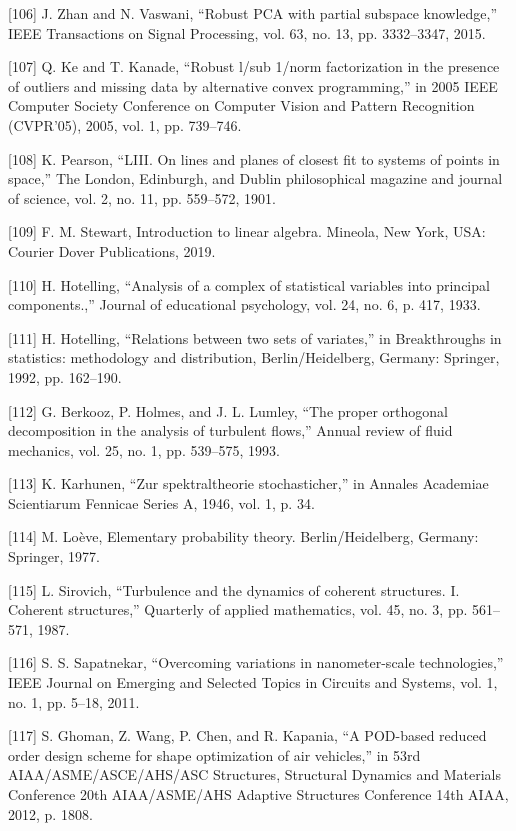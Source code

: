 \documentclass[sn-mathphys-num]{sn-jnl}%
\begin{document}
[106] J. Zhan and N. Vaswani, “Robust PCA with partial subspace knowledge,” IEEE Transactions on Signal Processing, vol. 63, no. 13, pp. 3332–3347, 2015.

[107] Q. Ke and T. Kanade, “Robust l/sub 1/norm factorization in the presence of outliers and missing data by alternative convex programming,” in 2005 IEEE Computer Society Conference on Computer Vision and Pattern Recognition (CVPR’05), 2005, vol. 1, pp. 739–746.

[108] K. Pearson, “LIII. On lines and planes of closest fit to systems of points in space,” The London, Edinburgh, and Dublin philosophical magazine and journal of science, vol. 2, no. 11, pp. 559–572, 1901.

[109] F. M. Stewart, Introduction to linear algebra. Mineola, New York, USA: Courier Dover Publications, 2019.

[110] H. Hotelling, “Analysis of a complex of statistical variables into principal components.,” Journal of educational psychology, vol. 24, no. 6, p. 417, 1933.

[111] H. Hotelling, “Relations between two sets of variates,” in Breakthroughs in statistics: methodology and distribution, Berlin/Heidelberg, Germany: Springer, 1992, pp. 162–190.

[112] G. Berkooz, P. Holmes, and J. L. Lumley, “The proper orthogonal decomposition in the analysis of turbulent flows,” Annual review of fluid mechanics, vol. 25, no. 1, pp. 539–575, 1993.

[113] K. Karhunen, “Zur spektraltheorie stochasticher,” in Annales Academiae Scientiarum Fennicae Series A, 1946, vol. 1, p. 34.

[114] M. Loève, Elementary probability theory. Berlin/Heidelberg, Germany: Springer, 1977.

[115] L. Sirovich, “Turbulence and the dynamics of coherent structures. I. Coherent structures,” Quarterly of applied mathematics, vol. 45, no. 3, pp. 561–571, 1987.

[116] S. S. Sapatnekar, “Overcoming variations in nanometer-scale technologies,” IEEE Journal on Emerging and Selected Topics in Circuits and Systems, vol. 1, no. 1, pp. 5–18, 2011.

[117] S. Ghoman, Z. Wang, P. Chen, and R. Kapania, “A POD-based reduced order design scheme for shape optimization of air vehicles,” in 53rd AIAA/ASME/ASCE/AHS/ASC Structures, Structural Dynamics and Materials Conference 20th AIAA/ASME/AHS Adaptive Structures Conference 14th AIAA, 2012, p. 1808.
\end{document}
